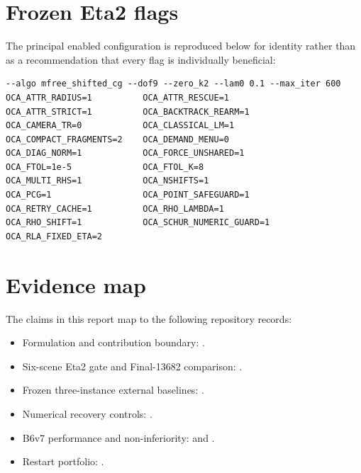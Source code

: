 \documentclass[10pt]{article}
\begin{document}
\appendix
\section{Frozen Eta2 flags}

The principal enabled configuration is reproduced below for identity rather than as a recommendation that every flag is individually beneficial:
\begin{verbatim}
--algo mfree_shifted_cg --dof9 --zero_k2 --lam0 0.1 --max_iter 600
OCA_ATTR_RADIUS=1          OCA_ATTR_RESCUE=1
OCA_ATTR_STRICT=1          OCA_BACKTRACK_REARM=1
OCA_CAMERA_TR=0            OCA_CLASSICAL_LM=1
OCA_COMPACT_FRAGMENTS=2    OCA_DEMAND_MENU=0
OCA_DIAG_NORM=1            OCA_FORCE_UNSHARED=1
OCA_FTOL=1e-5              OCA_FTOL_K=8
OCA_MULTI_RHS=1            OCA_NSHIFTS=1
OCA_PCG=1                  OCA_POINT_SAFEGUARD=1
OCA_RETRY_CACHE=1          OCA_RHO_LAMBDA=1
OCA_RHO_SHIFT=1            OCA_SCHUR_NUMERIC_GUARD=1
OCA_RLA_FIXED_ETA=2
\end{verbatim}

\section{Evidence map}

The claims in this report map to the following repository records:
\begin{itemize}
  \item Formulation and contribution boundary: .
  \item Six-scene Eta2 gate and Final-13682 comparison: .
  \item Frozen three-instance external baselines: .
  \item Numerical recovery controls: .
  \item B6v7 performance and non-inferiority:  and .
  \item Restart portfolio: .
\end{itemize}
\end{document}
